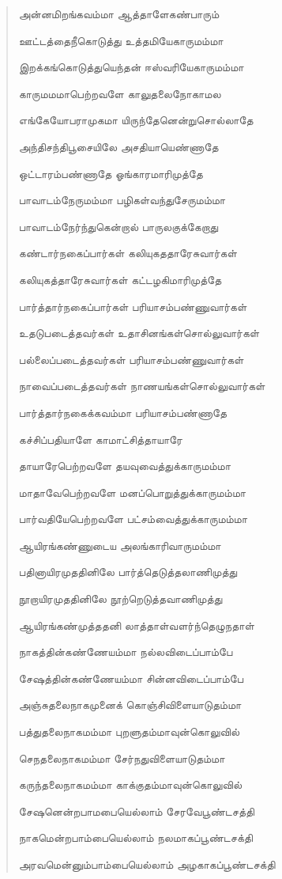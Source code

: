 \documentclass{article}
\begin{document}
\begin{quotation}
{அன்னமிறங்கவம்மா ஆத்தாளேகண்பாரும்

ஊட்டத்தைநீகொடுத்து உத்தமியேகாருமம்மா

இறக்கங்கொடுத்துயெந்தன் ஈஸ்வரியேகாருமம்மா

காருமமமாபெற்றவளே காலுதலைநோகாமல

எங்கேயோபராமுகமா யிருந்தேனென்றுசொல்லாதே

அந்திசந்திபூசையிலே அசதியாயெண்ணாதே

ஒட்டாரம்பண்ணாதே ஓங்காரமாரிமுத்தே

பாவாடம்நேருமம்மா பழிகள்வந்துசேருமம்மா

பாவாடம்நேர்ந்துகென்றால் பாருலகுக்கேறாது

கண்டார்நகைப்பார்கள் கலியுகததாரேசுவார்கள்

கலியுகத்தாரேசுவார்கள் கட்டழகிமாரிமுத்தே

பார்த்தார்நகைப்பார்கள் பரியாசம்பண்ணுவார்கள்

உதடுபடைத்தவர்கள் உதாசினங்கள்சொல்லுவார்கள்

பல்லைப்படைத்தவர்கள் பரியாசம்பண்ணுவார்கள்

நாவைப்படைத்தவர்கள் நாணயங்கள்சொல்லுவார்கள்

பார்த்தார்நகைக்கவம்மா பரியாசம்பண்ணாதே

கச்சிப்பதியாளே காமாட்சித்தாயாரே

தாயாரேபெற்றவளே தயவுவைத்துக்காருமம்மா

மாதாவேபெற்றவளே மனப்பொறுத்துக்காருமம்மா

பார்வதியேபெற்றவளே பட்சம்வைத்துக்காருமம்மா

ஆயிரங்கண்ணுடைய அலங்காரிவாருமம்மா

பதினாயிரமுததினிலே பார்த்தெடுத்தலாணிமுத்து

நூறாயிரமுததினிலே நூற்றெடுத்தவாணிமுத்து

ஆயிரங்கண்‌முத்ததனி லாத்தாள்வளர்ந்தெழுநதாள்  ‌

நாகத்தின்கண்ணேயம்மா நல்லவிடைப்பாம்பே

சேஷத்தின்கண்ணேயம்மா சின்னவிடைப்பாம்பே

அஞ்சுதலைநாகமுனைக் கொஞ்சிவிளையாடுதம்மா

பத்துதலைநாகமம்மா புறளுதம்மாவுன்கொலுவில்

செநதலைநாகமம்மா சேர்நதுவிளையாடுதம்மா

கருந்தலைநாகமம்மா காக்குதம்மாவுன்கொலுவில்

சேஷனென்றபாமபையெல்லாம் சேரவேபூண்டசத்தி

நாகமென்றபாம்பையெல்லாம் நலமாகப்பூண்டசக்தி

அரவமென்னும்பாம்பையெல்லாம் அழகாகப்பூண்டசக்தி

}
\end{quotation}
\end{document}
